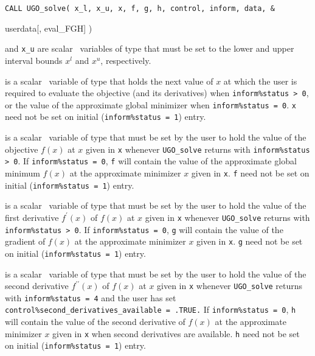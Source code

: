 \documentclass{galahad}
\newcommand{\packagename}{UGO}
\begin{document}
\hspace{8mm}
{\tt CALL \packagename\_solve( x\_l, x\_u, x, f, g, h, control, inform, data, \&
\vspace*{-1mm}

\hspace{37mm}
                        userdata[, eval\_FGH] )}
\vspace*{-2mm}
\begin{description}
 and {\tt x\_u} are scalar \intentin\ variables
of type \realdp that must be set to the lower and upper
interval bounds $x^l$ and $x^u$, respectively.

 is a scalar \intentinout\ variable of type \realdp that holds
the next value of $x$ at which the user is required to evaluate the
objective (and its derivatives) when {\tt inform\%status > 0},
or the value of the approximate global minimizer
when {\tt inform\%status = 0}.
{\tt x} need not be set on initial ({\tt inform\%status = 1}) entry.

 is a scalar \intentinout\ variable of type \realdp that must
be set by the user to hold the value of the objective $f(x)$ at $x$ given
in {\tt x} whenever {\tt \packagename\_solve} returns with
{\tt inform\%status > 0}.
If {\tt inform\%status = 0}, {\tt f} will contain the value of the
approximate global minimum $f(x)$ at the approximate minimizer $x$
given in {\tt x}.
{\tt f} need not be set on initial ({\tt inform\%status = 1}) entry.

 is a scalar \intentinout\ variable of type \realdp that must
be set by the user to hold the value of the first derivative $f^{\prime}(x)$
of $f(x)$ at $x$ given in {\tt x} whenever {\tt \packagename\_solve} returns
with {\tt inform\%status > 0}. If {\tt inform\%status = 0}, {\tt g}
will contain the value of the gradient of
$f(x)$ at the approximate minimizer $x$ given in {\tt x}.
{\tt g} need not be set on initial ({\tt inform\%status = 1}) entry.

 is a scalar \intentinout\ variable of type \realdp that must
be set by the user to hold the value of the second derivative $f^{\prime\prime}(x)$
of $f(x)$ at $x$ given in {\tt x} whenever {\tt \packagename\_solve} returns
with {\tt inform\%status = 4}
and the user has set {\tt control\%second\_derivatives\_available = .TRUE.}
If {\tt inform\%status = 0}, {\tt h}
will contain the value of the second derivative of
$f(x)$ at the approximate minimizer $x$ given in {\tt x} when
second derivatives are available.
{\tt h} need not be set on initial ({\tt inform\%status = 1}) entry.


\end{description}
\end{document}
